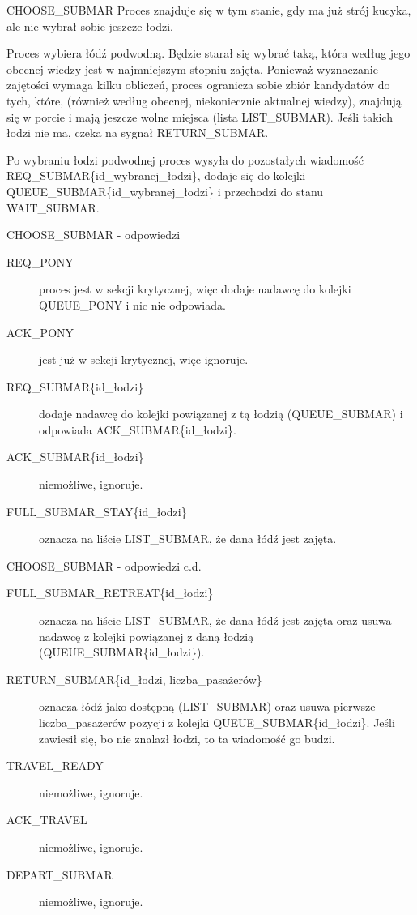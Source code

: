 \documentclass{beamer}
\begin{document}
\begin{frame}{CHOOSE\_SUBMAR}
    \internallinenumbers
    \resetlinenumber[1]
    Proces znajduje się w tym stanie, gdy ma już strój kucyka, ale nie wybrał sobie jeszcze łodzi.

    \vspace{0.4cm}
    Proces wybiera łódź podwodną. Będzie starał się wybrać taką, która według jego obecnej wiedzy jest w najmniejszym stopniu zajęta. Ponieważ wyznaczanie zajętości wymaga kilku obliczeń, proces ogranicza sobie zbiór kandydatów do tych, które, (również według obecnej, niekoniecznie aktualnej wiedzy), znajdują się w porcie i mają jeszcze wolne miejsca (lista LIST\_SUBMAR). Jeśli takich łodzi nie ma, czeka na sygnał RETURN\_SUBMAR.
    
    \vspace{0.4cm}
    Po wybraniu łodzi podwodnej proces wysyła do pozostałych wiadomość REQ\_SUBMAR\{id\_wybranej\_łodzi\}, dodaje się do kolejki QUEUE\_SUBMAR\{id\_wybranej\_łodzi\} i przechodzi do stanu WAIT\_SUBMAR.
\end{frame}

\begin{frame}{CHOOSE\_SUBMAR - odpowiedzi}
    \internallinenumbers
    \resetlinenumber[1]
    \begin{description}
        \item [REQ\_PONY] proces jest w sekcji krytycznej, więc dodaje nadawcę do kolejki QUEUE\_PONY i nic nie odpowiada. 
        \item [ACK\_PONY] jest już w sekcji krytycznej, więc ignoruje.
        \item [REQ\_SUBMAR\{id\_łodzi\}] dodaje nadawcę do kolejki powiązanej z tą łodzią (QUEUE\_SUBMAR) i odpowiada ACK\_SUBMAR\{id\_łodzi\}.
        \item [ACK\_SUBMAR\{id\_łodzi\}] niemożliwe, ignoruje.
        \item [FULL\_SUBMAR\_STAY\{id\_łodzi\}] oznacza na liście LIST\_SUBMAR, że dana łódź jest zajęta.

    \end{description}
\end{frame}

\begin{frame}{CHOOSE\_SUBMAR - odpowiedzi c.d.}
    \internallinenumbers
    \begin{description}
        \item [FULL\_SUBMAR\_RETREAT\{id\_łodzi\}] oznacza na liście LIST\_SUBMAR, że dana łódź jest zajęta oraz usuwa nadawcę z kolejki powiązanej z daną łodzią (QUEUE\_SUBMAR\{id\_łodzi\}).
        \item [RETURN\_SUBMAR\{id\_łodzi, liczba\_pasażerów\}] oznacza łódź jako dostępną (LIST\_SUBMAR) oraz usuwa pierwsze liczba\_pasażerów pozycji z kolejki QUEUE\_SUBMAR\{id\_łodzi\}. Jeśli zawiesił się, bo nie znalazł łodzi, to ta wiadomość go budzi.
        \item [TRAVEL\_READY] niemożliwe, ignoruje.
        \item [ACK\_TRAVEL] niemożliwe, ignoruje.
        \item [DEPART\_SUBMAR] niemożliwe, ignoruje.
    \end{description}
\end{frame}
\end{document}
